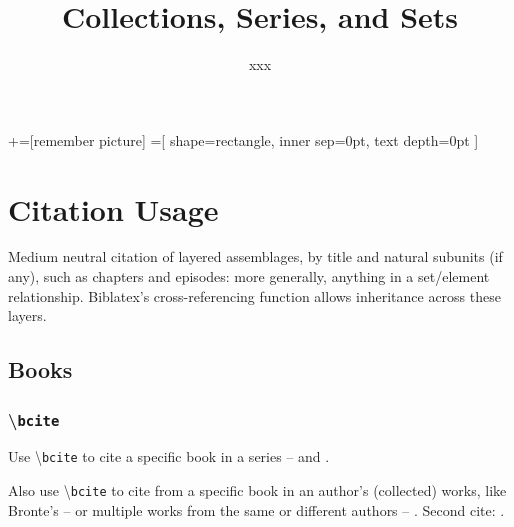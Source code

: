 \documentclass{article}
\title{Collections, Series, and Sets}
\author{xxx}
\newcommand\showcmnd[1]{%
\textbackslash\texttt{#1}%
}
\begin{document}
\maketitle
\tableofcontents
{}+=[remember picture]
=[
	shape=rectangle,
	inner sep=0pt,
	text depth=0pt
]
\section{Citation Usage}
Medium neutral citation of layered assemblages, 
by title and natural subunits (if any), such as chapters and episodes: more generally, anything in a set/element relationship. 
Biblatex's cross-referencing function allows inheritance across these layers.
\subsection{Books}
\subsubsection{\showcmnd{bcite}}
Use \showcmnd{bcite} to cite a specific book in a series -- {\color{blue}} and {\color{blue}}.


Also use \showcmnd{bcite} to cite from a specific book in an author's (collected) works, like Bronte's --  {\color{blue}} or multiple works from the same or different authors --  {\color{blue}}. Second cite: {\color{blue}}.

\end{document}
